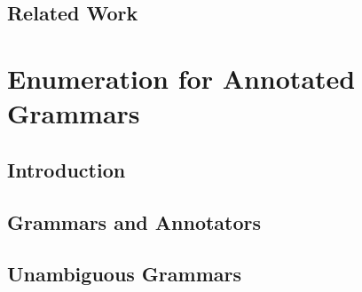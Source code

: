 \documentclass[pdftex]{pucthesis}	%
\begin{document}
\section{Related Work}



\chapter[ENUMERATION FOR ANNOTATED GRAMMARS]{Enumeration for Annotated Grammars} \label{ch2}

\section{Introduction}

%

\section{Grammars and Annotators}\label{gram:sec:models}

%

\section{Unambiguous Grammars} \label{gram:sec:cubic}

%

%

%

%

\end{document}
